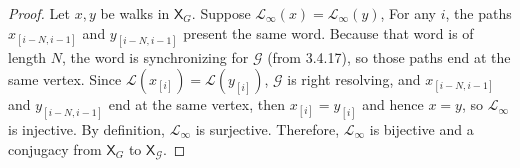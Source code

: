 \documentclass{article}
\newcommand{\Lc}{\mathcal{L}}  %
\newcommand{\Vc}{\mathcal{V}}
\newcommand{\Ec}{\mathcal{E}}
\newcommand{\shift}[1]{\mathsf{X}_{#1}}
\newcommand{\term}[1]{\textit{#1}}
\theoremstyle{definition}
\begin{document}
    \begin{proof}
        Let \(x, y\) be walks in \(\shift{G}\). Suppose \(\mathcal{L}_\infty(x)=\mathcal{L}_\infty(y)\),
        For any \(i\), the paths \(x_{[i-N, i-1]}\) and \(y_{[i-N, i-1]}\) present 
        the same word. Because that word is of length \(N\), the word is synchronizing
        for \(\mathcal{G}\) (from 3.4.17), so those paths end at the same vertex. Since
        \(\mathcal{L}(x_{[i]}) = \mathcal{L}(y_{[i]})\), \(\mathcal{G}\) is right 
        resolving, and \(x_{[i-N, i-1]}\) and \(y_{[i-N, i-1]}\) end at the same vertex,
        then \(x_{[i]} = y_{[i]}\) and hence \(x = y\), so \(\mathcal{L}_\infty\) is injective.
        By definition, \(\mathcal{L}_\infty\) is surjective. Therefore, \(\mathcal{L}_\infty\) is bijective and 
        a conjugacy from \(\mathsf{X}_G\) to \(\mathsf{X}_\mathcal{G}\).
    \end{proof}






\end{document}
